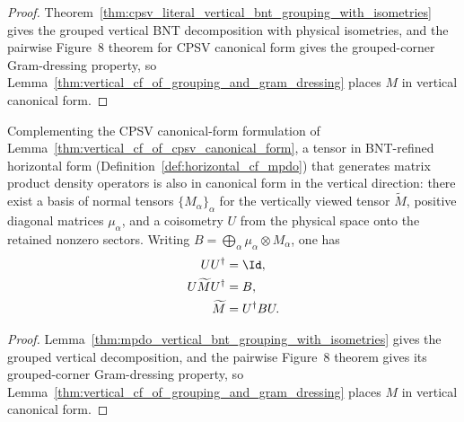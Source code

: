 \begin{proof}
    \leanok
    Theorem~\ref{thm:cpsv_literal_vertical_bnt_grouping_with_isometries}
    gives the grouped vertical BNT decomposition with physical isometries, and
    the pairwise Figure~8 theorem for CPSV canonical form gives the grouped-corner
    Gram-dressing property, so
    Lemma~\ref{thm:vertical_cf_of_grouping_and_gram_dressing} places $M$ in
    vertical canonical form.
\end{proof}


\begin{lemma}
    \label{thm:vertical_cf_of_horizontal_cf}
    \leanok
    Complementing the CPSV canonical-form formulation of
    Lemma~\ref{thm:vertical_cf_of_cpsv_canonical_form}, a tensor in
    BNT-refined horizontal form (Definition~\ref{def:horizontal_cf_mpdo})
    that generates matrix product density operators is also in canonical form in
    the vertical direction:
    there exist a basis of normal tensors $\{M_\alpha\}_\alpha$ for the
    vertically viewed tensor $\widetilde M$, positive diagonal matrices
    $\mu_\alpha$, and a coisometry $U$ from the physical space onto the
    retained nonzero sectors. Writing
    $B=\bigoplus_\alpha\mu_\alpha\otimes M_\alpha$, one has
    \begin{align}
        UU^\dagger             & =\Id,
        \notag                                  \\
        U\widetilde MU^\dagger & =B,
        \notag                                  \\
        \widetilde M           & =U^\dagger BU.
        \notag
    \end{align}
\end{lemma}

\begin{proof}
    \leanok
    Lemma~\ref{thm:mpdo_vertical_bnt_grouping_with_isometries} gives the
    grouped vertical decomposition, and the pairwise Figure~8 theorem gives
    its grouped-corner Gram-dressing property, so
    Lemma~\ref{thm:vertical_cf_of_grouping_and_gram_dressing} places $M$ in
    vertical canonical form.
\end{proof}
